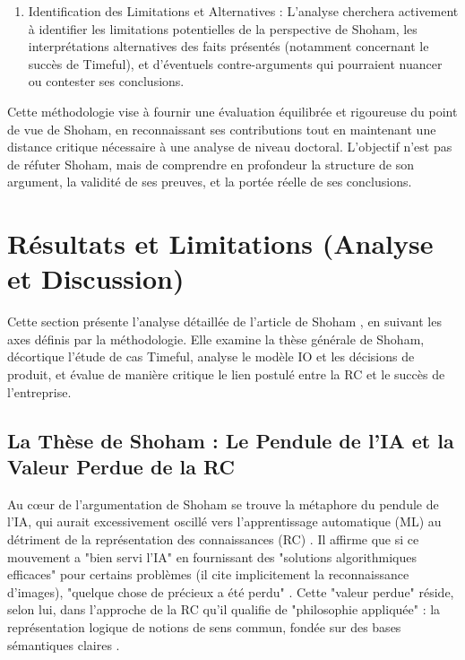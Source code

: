 \documentclass[11pt,a4paper]{article}
\begin{document}
\begin{enumerate}
    \item {Identification des Limitations et Alternatives :} L'analyse cherchera activement à identifier les limitations potentielles de la perspective de Shoham, les interprétations alternatives des faits présentés (notamment concernant le succès de Timeful), et d'éventuels contre-arguments qui pourraient nuancer ou contester ses conclusions.
\end{enumerate}

Cette méthodologie vise à fournir une évaluation équilibrée et rigoureuse du point de vue de Shoham, en reconnaissant ses contributions tout en maintenant une distance critique nécessaire à une analyse de niveau doctoral. L'objectif n'est pas de réfuter Shoham, mais de comprendre en profondeur la structure de son argument, la validité de ses preuves, et la portée réelle de ses conclusions.

\section{Résultats et Limitations (Analyse et Discussion)}
\label{sec:resultats}
Cette section présente l'analyse détaillée de l'article de Shoham \citep{Shoham2015Why}, en suivant les axes définis par la méthodologie. Elle examine la thèse générale de Shoham, décortique l'étude de cas Timeful, analyse le modèle IO et les décisions de produit, et évalue de manière critique le lien postulé entre la RC et le succès de l'entreprise.

\subsection{La Thèse de Shoham : Le Pendule de l'IA et la Valeur Perdue de la RC}

Au cœur de l'argumentation de Shoham se trouve la métaphore du pendule de l'IA, qui aurait excessivement oscillé vers l'apprentissage automatique (ML) au détriment de la représentation des connaissances (RC) \citep{Shoham2015Why}. Il affirme que si ce mouvement a "bien servi l'IA" en fournissant des "solutions algorithmiques efficaces" pour certains problèmes (il cite implicitement la reconnaissance d'images), "quelque chose de précieux a été perdu" \citep{Shoham2015Why}. Cette "valeur perdue" réside, selon lui, dans l'approche de la RC qu'il qualifie de "philosophie appliquée" : la représentation logique de notions de sens commun, fondée sur des bases sémantiques claires \citep{Shoham2015Why}.
\end{document}
